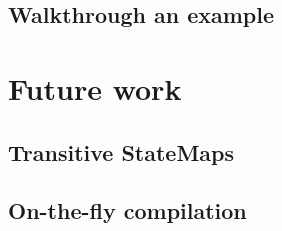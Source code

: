 \subsection{Walkthrough an example}

\section{Future work}
\subsection{Transitive StateMaps}
\subsection{On-the-fly compilation}